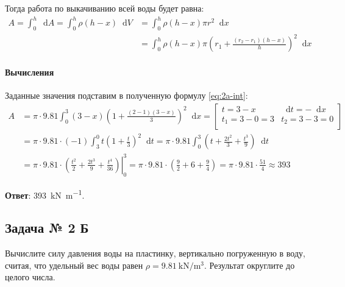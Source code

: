 \documentclass[a4paper,12pt]{article}
\newcommand*\diff{\mathop{}\!\mathrm{d}}
\begin{document}
Тогда работа по выкачиванию всей воды будет равна:
\begin{equation}\label{eq:2a-int}
\begin{split}
  A = \int_{0}^{h} \diff A
    = \int_{0}^{h} \rho (h - x) \diff V
    &= \int_{0}^{h} \rho (h - x) \pi r^2 \diff x \\
    &= \int_{0}^{h} \rho (h - x) \pi
       {\left(r_1 + \frac{(r_2 - r_1)(h - x)}{h}\right)}^2 \diff x
\end{split}
\end{equation}

\paragraph{Вычисления}

Заданные значения подставим в полученную формулу \ref{eq:2a-int}:
\begin{equation*}
\begin{split}
  A &= \pi \cdot 9.81 \int_{0}^{3} (3 - x)
      {\left(1 + \frac{(2 - 1)(3 - x)}{3} \right)}^2 \diff x
    =
      \begin{bmatrix}
        t = 3 - x        & \diff t = - \diff x \\
        t_1 = 3 - 0  = 3 & t_2 = 3 - 3 = 0 \\
      \end{bmatrix} \\
    &= \pi \cdot 9.81 \cdot (-1)
       \int_{3}^{0} t {\left(1 + \frac{t}{3}\right)}^2 \diff t
     = \pi \cdot 9.81
       \int_{0}^{3}
         \left(t + \frac{2 t^2}{3} + \frac{t^3}{9} \right) \diff t \\
    &= \pi \cdot 9.81 \cdot
       \left.
         \left(\frac{t^2}{2} + \frac{2 t^3}{9} + \frac{t^4}{36} \right)
       \right\rvert_{0}^{3}
     = \pi \cdot 9.81 \cdot
     \left(\frac{9}{2} + 6 + \frac{9}{4} \right)
     = \pi \cdot 9.81 \cdot \frac{51}{4}
     \approx 393
\end{split}
\end{equation*}

\textbf{Ответ}: \SI{393}{\kilo\newton\per\metre}.

\subsection{Задача № 2 Б}

Вычислите силу давления воды на пластинку, вертикально погруженную в воду,
считая, что удельный вес воды равен \(\rho = \SI{9.81}{\kN\per\cubic\metre}\).
Результат округлите до целого числа.
\end{document}
